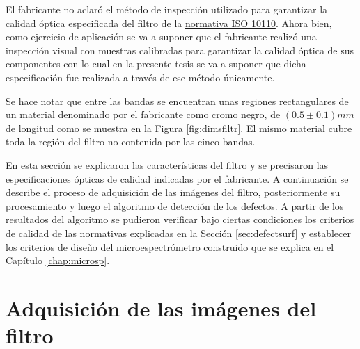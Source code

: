 El fabricante no aclaró el método de inspección utilizado para garantizar la calidad óptica especificada del filtro de la \underline{normativa ISO 10110}. Ahora bien, como ejercicio de aplicación se va a suponer que el fabricante realizó una inspección visual con muestras calibradas para garantizar la calidad óptica de sus componentes con lo cual en la presente tesis se va a suponer que dicha especificación fue realizada a través de ese método únicamente.

Se hace notar que entre las bandas se encuentran unas regiones rectangulares de un material denominado por el fabricante como cromo negro, de $(0.5 \pm 0.1)mm $ de longitud como se muestra en la Figura \ref{fig:dimsfiltr}. El mismo material cubre toda la región del filtro no contenida por las cinco bandas.

En esta sección se explicaron las características del filtro y se precisaron las especificaciones ópticas de calidad indicadas por el fabricante. A continuación se describe el proceso de adquisición de las imágenes del filtro, posteriormente su procesamiento y luego el algoritmo de detección de los defectos. A partir de los resultados del algoritmo se pudieron verificar bajo ciertas condiciones los criterios de calidad de las normativas explicadas en la Sección \ref{sec:defectsurf} y establecer los criterios de diseño del microespectrómetro construido que se explica en el Capítulo \ref{chap:microsp}.

\singlespacing
\section{Adquisición de las imágenes del filtro}
\label{sec:conf}

